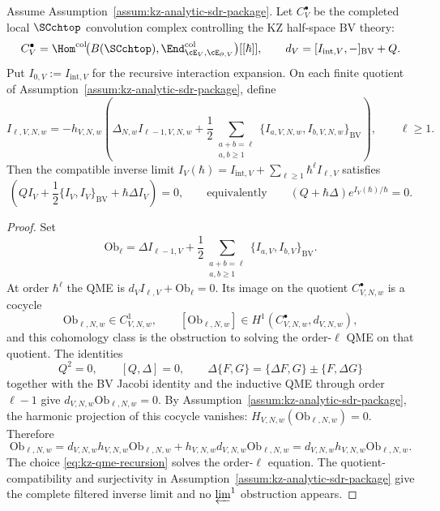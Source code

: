 \begin{proposition}
\label{prop:kz-all-loop-counterterm-recursion}
Assume Assumption~\ref{assum:kz-analytic-sdr-package}.
Let $C_V^\bullet$ be the completed local
$\SCchtop$ convolution complex controlling the KZ half-space
BV theory:
\[
C_V^\bullet
=
\Hom^{\mathrm{col}}\!\bigl(
B(\SCchtop),
\End^{\mathrm{col}}_{\cE_V,\cE_{\partial,V}}\bigr)[[\hbar]],
\qquad
d_V=[I_{\mathrm{int},V},{-}]_{\mathrm{BV}}+Q .
\]
Put $I_{0,V}:=I_{\mathrm{int},V}$ for the recursive interaction
expansion. On each finite quotient of
Assumption~\ref{assum:kz-analytic-sdr-package}, define
\begin{equation}\label{eq:kz-qme-recursion}
I_{\ell,V,N,w}
=
-h_{V,N,w}\!\left(
\Delta_{N,w} I_{\ell-1,V,N,w}
+\frac12
\sum_{\substack{a+b=\ell\\ a,b\geq 1}}
\{I_{a,V,N,w},I_{b,V,N,w}\}_{\mathrm{BV}}
\right),
\qquad \ell\geq 1 .
\end{equation}
Then the compatible inverse limit
$I_V(\hbar)=I_{\mathrm{int},V}+\sum_{\ell\ge1}\hbar^\ell I_{\ell,V}$
satisfies
\[
\left(QI_V+\frac12\{I_V,I_V\}_{\mathrm{BV}}
+\hbar\Delta I_V\right)=0,
\qquad\text{equivalently}\qquad
\left(Q+\hbar\Delta\right)e^{I_V(\hbar)/\hbar}=0 .
\]
\end{proposition}

\begin{proof}
Set
\[
\mathrm{Ob}_{\ell}
=
\Delta I_{\ell-1,V}
+\frac12
\sum_{\substack{a+b=\ell\\ a,b\geq 1}}
\{I_{a,V},I_{b,V}\}_{\mathrm{BV}} .
\]
At order $\hbar^\ell$ the QME is
$d_V I_{\ell,V}+\mathrm{Ob}_\ell=0$. Its image on the quotient
$C_{V,N,w}^\bullet$ is a cocycle
\[
\mathrm{Ob}_{\ell,N,w}\in C_{V,N,w}^1,
\qquad
[\mathrm{Ob}_{\ell,N,w}]
\in H^1(C_{V,N,w}^\bullet,d_{V,N,w}),
\]
and this cohomology class is the obstruction to solving the
order-$\ell$ QME on that quotient. The identities
\[
Q^2=0,\qquad [Q,\Delta]=0,\qquad
\Delta\{F,G\}=\{\Delta F,G\}\pm\{F,\Delta G\}
\]
together with the BV Jacobi identity and the inductive QME through
order $\ell-1$ give $d_{V,N,w}\mathrm{Ob}_{\ell,N,w}=0$. By
Assumption~\ref{assum:kz-analytic-sdr-package}, the harmonic
projection of this cocycle vanishes:
$H_{V,N,w}(\mathrm{Ob}_{\ell,N,w})=0$.
Therefore
\[
\mathrm{Ob}_{\ell,N,w}
=d_{V,N,w}h_{V,N,w}\mathrm{Ob}_{\ell,N,w}
+h_{V,N,w}d_{V,N,w}\mathrm{Ob}_{\ell,N,w}
=d_{V,N,w}h_{V,N,w}\mathrm{Ob}_{\ell,N,w}.
\]
The choice \eqref{eq:kz-qme-recursion} solves the order-$\ell$
equation. The quotient-compatibility and surjectivity in
Assumption~\ref{assum:kz-analytic-sdr-package} give the complete
filtered inverse limit and no $\varprojlim^1$ obstruction appears.
\end{proof}


